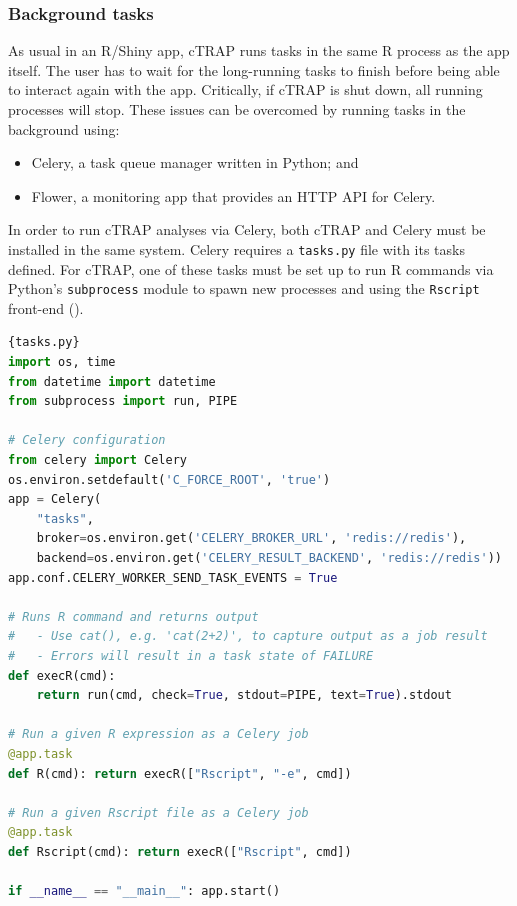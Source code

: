 \subsubsection{Background tasks}

As usual in an R/Shiny app, cTRAP runs tasks in the same R process as the app itself. The user has to wait for the long-running tasks to finish before being able to interact again with the app. Critically, if cTRAP is shut down, all running processes will stop. These issues can be overcomed by running tasks in the background using:

\begin{itemize}
	\item Celery, a task queue manager written in Python; and
	\item Flower, a monitoring app that provides an HTTP API for Celery.
\end{itemize}

In order to run cTRAP analyses via Celery, both cTRAP and Celery must be installed in the same system. Celery requires a \texttt{tasks.py} file with its tasks defined. For cTRAP, one of these tasks must be set up to run R commands via Python's \texttt{subprocess} module to spawn new processes and using the \texttt{Rscript} front-end ().

\begin{lstlisting}[language=python,caption=An example \texttt{tasks.py} file to run R commands or Rscript files via Celery.,label={lst:tasks.py},morekeywords={import},keywordstyle=\bfseries]{tasks.py}
import os, time
from datetime import datetime
from subprocess import run, PIPE

# Celery configuration
from celery import Celery
os.environ.setdefault('C_FORCE_ROOT', 'true')
app = Celery(
    "tasks",
    broker=os.environ.get('CELERY_BROKER_URL', 'redis://redis'),
    backend=os.environ.get('CELERY_RESULT_BACKEND', 'redis://redis'))
app.conf.CELERY_WORKER_SEND_TASK_EVENTS = True

# Runs R command and returns output
#   - Use cat(), e.g. 'cat(2+2)', to capture output as a job result
#   - Errors will result in a task state of FAILURE
def execR(cmd):
    return run(cmd, check=True, stdout=PIPE, text=True).stdout

# Run a given R expression as a Celery job
@app.task
def R(cmd): return execR(["Rscript", "-e", cmd])

# Run a given Rscript file as a Celery job
@app.task
def Rscript(cmd): return execR(["Rscript", cmd])

if __name__ == "__main__": app.start()
\end{lstlisting}

